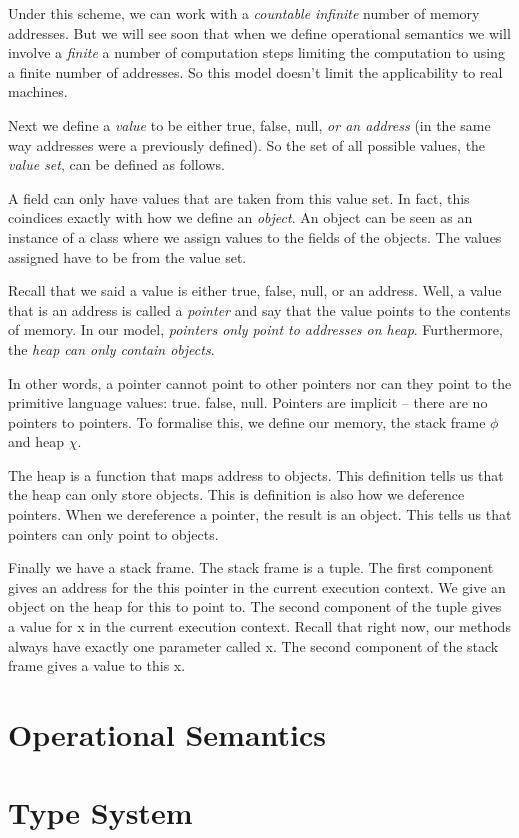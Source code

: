 
Under this scheme, we can work with a \textit{countable infinite} 
number of memory addresses. 
But we will see soon that when we define operational semantics
we will involve a \textit{finite} a number of computation 
steps limiting the computation to using a finite number of addresses. 
So this model doesn't limit the applicability to real machines.

Next we define a \textit{value} to be either true, false, null, \textit{or 
an address} (in the same way addresses were a previously defined). 
So the set of all possible values, 
the \textit{value set}, can be defined as follows.


A field can only have values that are taken from this value set. 
In fact, this coindices exactly with how we define an \textit{object}. 
An object can be seen as an instance 
of a class where we assign values to the fields of the objects. 
The values assigned have to be from the value set.


Recall that we said a value is either true, false, null, or 
an address. Well, a value that is an address is called a
 \textit{pointer} and say that the value points to the contents of memory.
In our model, \textit{pointers only point to addresses on heap}. 
Furthermore, the \textit{heap can only contain objects}.

In other words, a pointer cannot point to other pointers nor can they point to the primitive language values: true. false, null. Pointers are implicit – there are 
no pointers to pointers. To formalise this, we define our memory, the stack 
frame $\phi$ and heap $\chi$.


The heap is a function that maps address to objects. 
This definition tells us that the heap can only store objects. 
This is definition is also how we deference pointers. When we 
dereference a pointer, the result is an object. This tells us that 
pointers can only point to objects.

Finally we have a stack frame.
The stack frame is a tuple. The first component gives an address for the this
pointer in the current execution context. We give an object on the heap for this 
to point to. The second component of the tuple gives a value for x in the 
current execution context. Recall that right now, our methods always have exactly
one parameter called x. The second component of the stack frame gives a value to this x. 

\frmrule


\section{Operational Semantics}

\section{Type System}